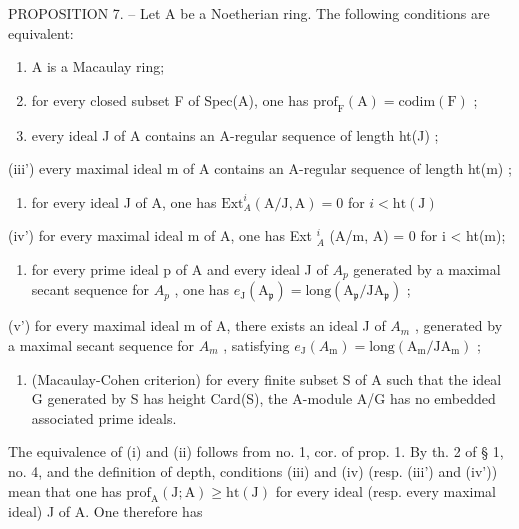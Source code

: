 PROPOSITION 7. -- Let A be a Noetherian ring. The following conditions are equivalent:

\begin{enumerate}
\def\labelenumi{(\roman{enumi})}
\item
  A is a Macaulay ring;
\item
  for every closed subset F of Spec(A), one has \(\mathrm{prof}_{\mathrm{F}}(\mathrm{A}) = \mathrm{codim}(\mathrm{F})\) ;
\item
  every ideal J of A contains an A-regular sequence of length ht(J) ;
\end{enumerate}

(iii') every maximal ideal m of A contains an A-regular sequence of length ht(m) ;

\begin{enumerate}
\def\labelenumi{(\roman{enumi})}
\setcounter{enumi}{3}
\tightlist
\item
  for every ideal J of A, one has \(\mathrm{Ext}_A^i (\mathrm{A} / \mathrm{J},\mathrm{A}) = 0\) for \(i <   \mathrm{ht}(\mathrm{J})\)
\end{enumerate}

(iv') for every maximal ideal m of A, one has Ext \(_{A}^{i}\) (A/m, A) = 0 for i \textless{} ht(m);

\begin{enumerate}
\def\labelenumi{(\alph{enumi})}
\setcounter{enumi}{21}
\tightlist
\item
  for every prime ideal p of A and every ideal J of \(A_{p}\) generated by a maximal secant sequence for \(A_{p}\) , one has \(e_{\mathrm{J}}(\mathrm{A}_{\mathfrak{p}})=\mathrm{long}(\mathrm{A}_{\mathfrak{p}}/\mathrm{JA}_{\mathfrak{p}})\) ;
\end{enumerate}

(v') for every maximal ideal m of A, there exists an ideal J of \(A_{m}\) , generated by a maximal secant sequence for \(A_{m}\) , satisfying \(e_{\mathrm{J}}(A_{\mathrm{m}})=\mathrm{long}(\mathrm{A}_{\mathrm{m}}/\mathrm{JA}_{\mathrm{m}})\) ;

\begin{enumerate}
\def\labelenumi{(\roman{enumi})}
\setcounter{enumi}{5}
\tightlist
\item
  (Macaulay-Cohen criterion) for every finite subset S of A such that the ideal G generated by S has height Card(S), the A-module A/G has no embedded associated prime ideals.
\end{enumerate}

The equivalence of (i) and (ii) follows from no. 1, cor. of prop. 1. By th. 2 of § 1, no. 4, and the definition of depth, conditions (iii) and (iv) (resp. (iii') and (iv')) mean that one has \(\mathrm{prof}_{\mathrm{A}}(\mathrm{J};\mathrm{A})\geqslant \mathrm{ht}(\mathrm{J})\) for every ideal (resp. every maximal ideal) J of A. One therefore has

